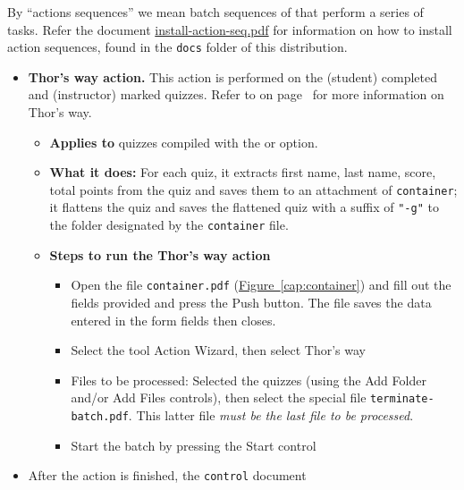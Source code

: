 \documentclass{article}
\begin{document}
By ``actions sequences'' we mean batch sequences of  that
perform a series of tasks. Refer the document
\href{install-action-seq.pdf}{install-action-seq.pdf} for information on
how to install action sequences, found in the \texttt{docs} folder of this
distribution.
\begin{itemize}
  \item\textbf{\textsf{Thor's way} action.} This action is performed on the (student)
      completed and (instructor) marked quizzes. Refer to
      \textbf{} on page~\pageref{sss:TW} for more information
      on \textsf{Thor's way}.
      \begin{itemize}
        \item \textbf{Applies to} quizzes compiled with the
             or  option.
        \item\textbf{What it does:} For each quiz, it extracts first
            name, last name, score, total points from the quiz and saves
            them to an attachment of \texttt{container}; it flattens
            the quiz and saves the flattened quiz with a suffix of
            \texttt{"-g"} to the folder designated by the
            \texttt{container} file.
        \item\textbf{Steps to run the \textsf{Thor's way} action}
        \begin{itemize}
          \item Open the file \texttt{container.pdf}
              (\hyperref[cap:container]{Figure~\ref*{cap:container}})
              and fill out the fields provided and press the
              \textsf{Push} button. The file saves the data entered in
              the form fields then closes.
          \item Select the tool \textsf{Action Wizard}, then select
              \textsf{Thor's way}
          \item\textsf{Files to be processed:} Selected the quizzes
              (using the \textsf{Add Folder} and/or \textsf{Add Files}
              controls), then select the special file
              \texttt{terminate-batch.pdf}. This latter file \emph{must
              be the last file to be processed}.
          \item Start the batch by pressing the \textsf{Start} control
        \end{itemize}
      \end{itemize}
      \item[] After the action is finished, the \texttt{control} document

\end{itemize}
\end{document}
